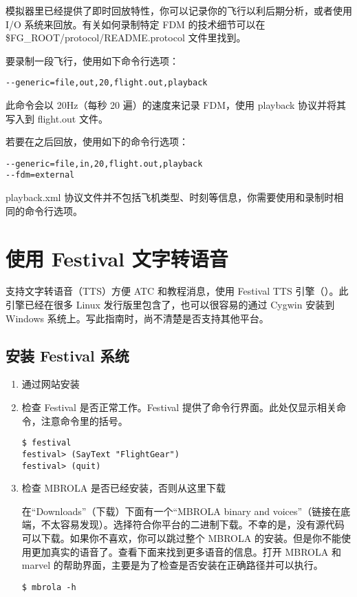 模拟器里已经提供了即时回放特性，你可以记录你的飞行以利后期分析，或者使用 I/O 系统来回放。有关如何录制特定 FDM 的技术细节可以在 \$FG\_ROOT/protocol/README.protocol 文件里找到。

要录制一段飞行，使用如下命令行选项：

\begin{verbatim}
--generic=file,out,20,flight.out,playback
\end{verbatim}

此命令会以 20Hz（每秒 20 遍）的速度来记录 FDM，使用 playback 协议并将其写入到 flight.out 文件。

若要在之后回放，使用如下的命令行选项：

\begin{verbatim}
--generic=file,in,20,flight.out,playback
--fdm=external
\end{verbatim}

playback.xml 协议文件并不包括飞机类型、时刻等信息，你需要使用和录制时相同的命令行选项。

\section{使用 Festival 文字转语音}\label{TTS}

\FlightGear{} 支持文字转语音（TTS）方便 ATC 和教程消息，使用 Festival TTS 引擎（）。此引擎已经在很多 Linux 发行版里包含了，也可以很容易的通过 Cygwin 安装到 Windows 系统上。写此指南时，尚不清楚是否支持其他平台。

\subsection{安装 Festival 系统}

\begin{enumerate}
\item 通过网站安装

\item 检查 Festival 是否正常工作。Festival 提供了命令行界面。此处仅显示相关命令，注意命令里的括号。

\begin{verbatim}
$ festival
festival> (SayText "FlightGear")
festival> (quit)
\end{verbatim}

\item 检查 MBROLA 是否已经安装，否则从这里下载


在“Downloads”（下载）下面有一个“MBROLA binary and voices”（链接在底端，不太容易发现）。选择符合你平台的二进制下载。不幸的是，没有源代码可以下载。如果你不喜欢，你可以跳过整个 MBROLA 的安装。但是你不能使用更加真实的语音了。查看下面来找到更多语音的信息。打开 MBROLA 和 marvel 的帮助界面，主要是为了检查是否安装在正确路径并可以执行。

\begin{verbatim}
$ mbrola -h
\end{verbatim}
\end{enumerate}


